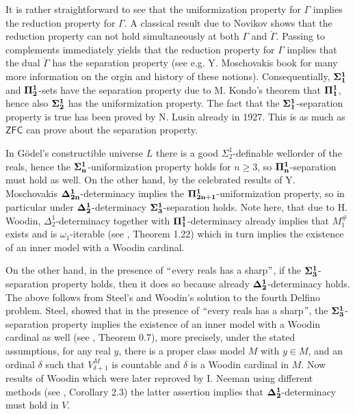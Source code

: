 \documentclass[a4paper,11pt]{article}
\newcommand{\ZFC}{\mathsf{ZFC}}
\begin{document}
It is rather straightforward to see that the uniformization property for $\Gamma$ implies the reduction property for $\Gamma$. A classical result due to Novikov shows that the reduction property can not hold simultaneously at both $\Gamma$ and $\check{\Gamma}$. Passing to complements immediately yields that the reduction property for $\Gamma$ implies that the dual $\check{\Gamma}$ has the separation property (see e.g. Y. Moschovakis book \cite{Moschovakis} for many more information on the orgin and history of these notions). Consequentially, $\bf{\Sigma^1_1}$ and $\bf{\Pi^1_2}$-sets have the separation property due to M. Kondo's theorem that $\bf{\Pi^1_1}$, hence also $\bf{\Sigma^1_2}$ has the uniformization property. The fact that the $\bf{\Sigma^1_1}$-separation property is true has been proved by N. Lusin already in 1927.  This is as much as $\ZFC$ can prove about the separation property. 

In G\"odel's constructible universe $L$ there is a good $\Sigma^1_2$-definable wellorder of the reals, hence the $\bf{\Sigma^1_n}$-uniformization property holds for $n\ge 3$, so $\bf{\Pi^1_n}$-separation must hold as well. On the other hand, by the celebrated results of Y. Moschovakis $\bf{\Delta}^1_{2n}$-determinacy implies the $\bf{\Pi}^1_{2n+1}$-uniformization property, so in particular under $\bf{\Delta}^1_2$-determinacy $\bf{\Sigma^1_3}$-separation holds.
Note here, that due to H. Woodin, ${\Delta^1_2}$-determinacy together with $\bf{\Pi}^1_1$-determinacy already implies that $M_1^{\#}$ exists and is $\omega_1$-iterable (see \cite{MSW}, Theorem 1.22) which in turn implies the existence of an inner model with a Woodin cardinal.

On the other hand, in the presence of $``$every reals has a sharp$"$, if the $\bf{\Sigma}^1_3$-separation property holds, then it does so because already $\bf{\Delta}^1_2$-determinacy holds. The above follows from Steel's and Woodin's solution to the fourth Delfino problem.  Steel, showed that in the presence of $``$every reals has a sharp$"$, the $\bf{\Sigma}^1_3$-separation property implies the existence of an inner model with a Woodin cardinal as well (see \cite{Steel}, Theorem 0.7), more precisely, under the stated assumptions, for any real $y$, there is a proper class model $M$ with $y \in M$, and an ordinal $\delta$ such that $V^M_{\delta+1}$ is countable and $\delta$ is a Woodin cardinal in $M$. Now results of Woodin which were later reproved by I. Neeman using different methods (see \cite{Neeman}, Corollary 2.3) the latter assertion implies that $\bf{\Delta}^1_2$-determinacy must hold in $V$.
\end{document}
